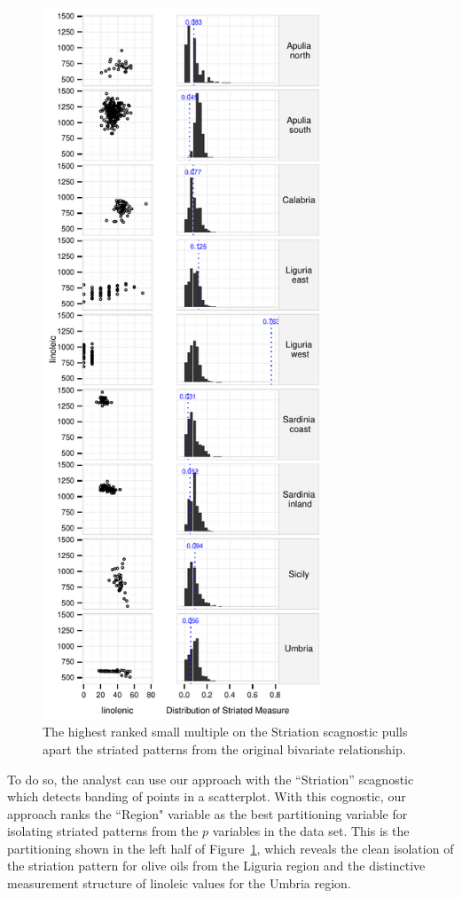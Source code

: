 \begin{figure}
	\includegraphics[width=3.25in]{images/15_729035813077-region.pdf}
	  \caption{The highest ranked small multiple on the Striation scagnostic pulls apart the striated patterns from the original bivariate relationship. }
	 \label{fig:vrich_sm}
\end{figure}

To do so, the analyst can use our approach with the ``Striation'' scagnostic~\cite{Wilkinson2005} which detects banding of points in a scatterplot. With this cognostic, our approach ranks the ``Region" variable as the best partitioning variable for isolating striated patterns from the $p$ variables in the data set. This is the partitioning shown in the left half of Figure~\ref{fig:vrich_sm}, which reveals the clean isolation of the striation pattern for olive oils from the Liguria region and the distinctive measurement structure of linoleic values for the Umbria region.

